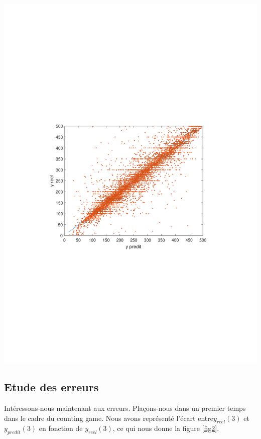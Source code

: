 \documentclass{scrreprt}
\begin{document}
\begin{center}
\includegraphics[trim = 3cm 9cm 3cm 9cm, clip]{yreelypredit.pdf}
\label{fig1}
\end{center}

\begin{multicols}{2}

\section{Etude des erreurs}

Intéressons-nous maintenant aux erreurs. Plaçons-nous dans un premier temps dans le cadre du counting game. Nous avons représenté l'écart entre$ y_{reel}(3)$ et $y_{predit}(3)$ en fonction de $ y_{reel}(3)$, ce qui nous donne la figure \ref{fig2}.\\

\end{multicols}
\end{document}
